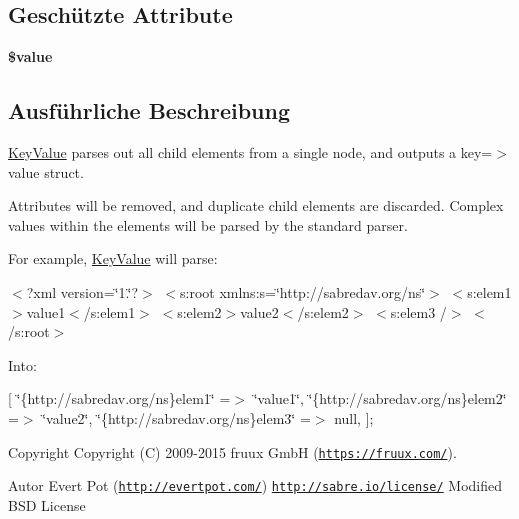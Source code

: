 \subsection*{Geschützte Attribute}
\begin{DoxyCompactItemize}
\item 
\mbox{\label{class_sabre_1_1_xml_1_1_element_1_1_key_value_a6d9f660aac534fa0038fbfac0fcb964e}} 
{\bfseries \$value}
\end{DoxyCompactItemize}


\subsection{Ausführliche Beschreibung}
\textquotesingle{}\mbox{\hyperlink{class_sabre_1_1_xml_1_1_element_1_1_key_value}{Key\+Value}}\textquotesingle{} parses out all child elements from a single node, and outputs a key=$>$value struct.

Attributes will be removed, and duplicate child elements are discarded. Complex values within the elements will be parsed by the \textquotesingle{}standard\textquotesingle{} parser.

For example, \mbox{\hyperlink{class_sabre_1_1_xml_1_1_element_1_1_key_value}{Key\+Value}} will parse\+:

$<$?xml version=\char`\"{}1.\char`\"{}?$>$ $<$s\+:root xmlns\+:s=\char`\"{}http\+://sabredav.\+org/ns\char`\"{}$>$ $<$s\+:elem1$>$value1$<$/s\+:elem1$>$ $<$s\+:elem2$>$value2$<$/s\+:elem2$>$ $<$s\+:elem3 /$>$ $<$/s\+:root$>$

Into\+:

\mbox{[} \char`\"{}\{http\+://sabredav.\+org/ns\}elem1\char`\"{} =$>$ \char`\"{}value1\char`\"{}, \char`\"{}\{http\+://sabredav.\+org/ns\}elem2\char`\"{} =$>$ \char`\"{}value2\char`\"{}, \char`\"{}\{http\+://sabredav.\+org/ns\}elem3\char`\"{} =$>$ null, \mbox{]};

\begin{DoxyCopyright}{Copyright}
Copyright (C) 2009-\/2015 fruux GmbH (\href{https://fruux.com/}{\tt https\+://fruux.\+com/}). 
\end{DoxyCopyright}
\begin{DoxyAuthor}{Autor}
Evert Pot (\href{http://evertpot.com/}{\tt http\+://evertpot.\+com/})  \href{http://sabre.io/license/}{\tt http\+://sabre.\+io/license/} Modified B\+SD License 
\end{DoxyAuthor}



